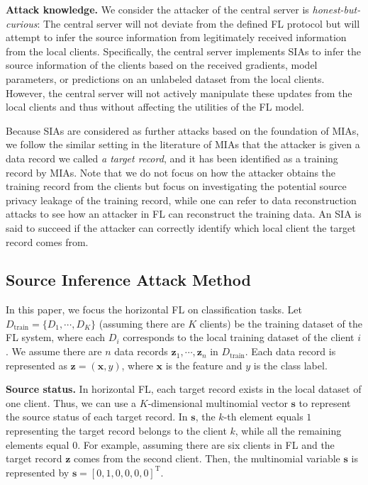 \documentclass[10pt,journal,compsoc]{IEEEtran}
\begin{document}
\noindent \textbf{Attack knowledge.} We consider the attacker of the central server is \textit{honest-but-curious}: The central server will not deviate from the defined FL protocol but will attempt to infer the source information from legitimately received information from the local clients. Specifically, the central server implements SIAs to infer the source information of the clients based on the received gradients, model parameters, or predictions on an unlabeled dataset from the local clients. However, the central server will not actively manipulate these updates from the local clients and thus without affecting the utilities of the FL model. 

Because SIAs are considered as further attacks based on the foundation of MIAs, we follow the similar setting in the literature of MIAs \cite{shokri2017membership,salem2019ml,hu2022membership} that the attacker is given a data record we called \textit{a target record}, and it has been identified as a training record by MIAs. Note that we do not focus on how the attacker obtains the training record from the clients but focus on investigating the potential source privacy leakage of the training record, while one can refer to data reconstruction attacks \cite{zhu2019deep,hitaj2017deep,yin2021comprehensive,fowl2021robbing,boenisch2021curious} to see how an attacker in FL can reconstruct the training data. An SIA is said to succeed if the attacker can correctly identify which local client the target record comes from.

\subsection{Source Inference Attack Method}
In this paper, we focus the horizontal FL on classification tasks. Let $D_\textrm{train}=\{D_1,\cdots,D_K\}$ (assuming there are $K$ clients) be the training dataset of the FL system, where each $D_i$ corresponds to the local training dataset of the client $i$. We assume there are $n$ data records ${\bm{z}_1, \cdots, \bm{z}_n}$ in $D_\textrm{train}$. Each data record is represented as $\bm{z}=(\bm{x},y)$, where $\bm{x}$ is the feature and $y$ is the class label. 

\noindent \textbf{Source status. \;} In horizontal FL, each target record exists in the local dataset of one client. Thus, we can use a $K$-dimensional multinomial vector $\bm{s}$ to represent the source status of each target record. In $\bm{s}$, the $k$-th element equals $1$ representing the target record belongs to the client $k$, while all the remaining elements equal $0$. For example, assuming there are six clients in FL and the target record $\bm{z}$ comes from the second client. Then, the multinomial variable $\bm{s}$ is represented by $\bm{s}=[0,1,0,0,0,0]^{\text{T}}$. 
\end{document}
